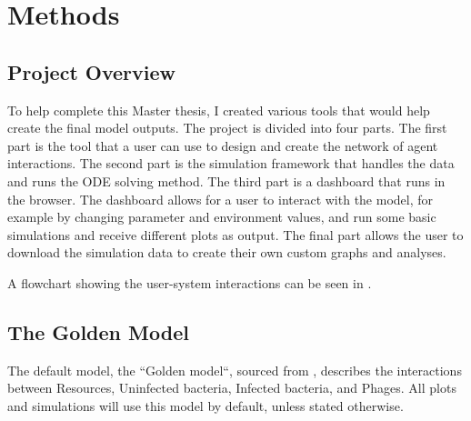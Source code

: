 \chapter{Methods}
\label{Methods}
\section{Project Overview}
To help complete this Master thesis, I created various tools that would help create the final model outputs.
The project is divided into four parts. 
The first part is the tool that a user can use to design and create the network of agent interactions. 
The second part is the simulation framework that handles the data and runs the ODE solving method. 
The third part is a dashboard that runs in the browser. The dashboard allows for a user to interact with the model, for example by changing parameter and environment values, and run some basic simulations and receive different plots as output. 
The final part allows the user to download the simulation data to create their own custom graphs and analyses. 

A flowchart showing the user-system interactions can be seen in . 

\section{The Golden Model}
\label{sec:golden_model}
The default model, the “Golden model“, sourced from \citet{gengUsingBacterialPopulation2024}, describes the interactions between Resources, Uninfected bacteria, Infected bacteria, and Phages. 
All plots and simulations will use this model by default, unless stated otherwise. 


